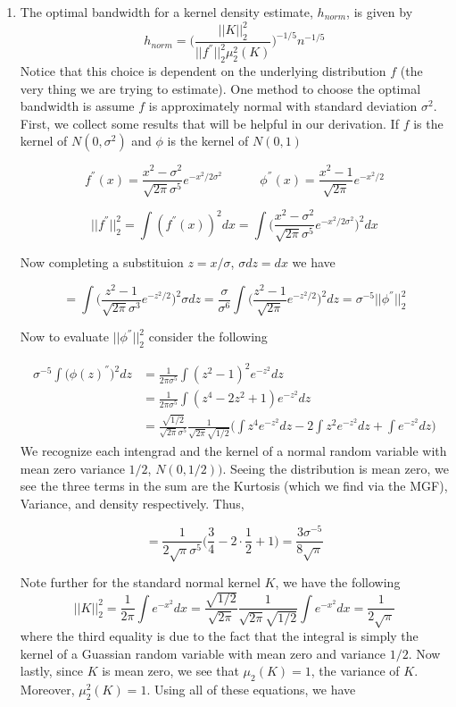 \documentclass[12pt]{article}  %
\begin{document}
\begin{enumerate}

\item The optimal bandwidth for a kernel density estimate, $h_{norm}$, is given by $$h_{norm} = \Big(\frac{||K||_{2}^2}{||f^{''}||_2^2\mu_{2}^{2}(K)}\Big)^{-1/5}n^{-1/5}$$ Notice that this choice is dependent on the underlying distribution $f$ (the very thing we are trying to estimate). One method to choose the optimal bandwidth is assume $f$ is approximately normal with standard deviation $\sigma^2$. First, we collect some results that will be helpful in our derivation. If $f$ is the kernel of $N(0,\sigma^2)$ and $\phi$ is the kernel of $N(0,1)$

$$f^{''}(x) = \frac{x^2-\sigma^2}{\sqrt{2\pi}\sigma^5}e^{-x^2/2\sigma^2}\hspace{3em}\phi^{''}(x) =\frac{x^2 -1}{\sqrt{2\pi}}e^{-x^2/2} $$

$$||f^{''}||_2^2 = \int (f^{''}(x))^2dx = \int \bigg(\frac{x^2-\sigma^2}{\sqrt{2\pi}\sigma^5}e^{-x^2/2\sigma^2}\bigg)^2dx$$

Now completing a substituion $z = x/\sigma$, $\sigma dz = dx$ we have 

$$ = \int \bigg(\frac{z^2-1}{\sqrt{2\pi}\sigma^3}e^{-z^2/2}\bigg)^2\sigma dz = \frac{\sigma}{\sigma^6}\int \bigg(\frac{z^2-1}{\sqrt{2\pi}}e^{-z^2/2}\bigg)^2dz = \sigma^{-5}||\phi^{''}||_2^2$$

Now to evaluate $||\phi^{''}||_2^2$ consider the following 

\begin{align*}
\sigma^{-5}\int\big(\phi(z)^{''}\big)^2dz &= \frac{1}{2\pi\sigma^5}\int (z^2-1)^2e^{-z^2}dz\\
&=  \frac{1}{2\pi\sigma^5}\int(z^4 -2z^2 + 1)e^{-z^2}dz\\
&= \frac{\sqrt{1/2}}{\sqrt{2\pi}\sigma^5}\frac{1}{\sqrt{2\pi}\sqrt{1/2}}\bigg(\int z^4e^{-z^2}dz -2 \int z^2e^{-z^2}dz + \int e^{-z^2}dz\bigg)
\end{align*}
We recognize each intengrad and the kernel of a normal random variable with mean zero variance $1/2$, $N(0,1/2))$. Seeing the distribution is mean zero, we see the three terms in the sum are the Kurtosis (which we find via the MGF), Variance, and density respectively. Thus, 

$$ = \frac{1}{2\sqrt{\pi}\sigma^5}\Big(\frac{3}{4} - 2\cdot\frac{1}{2} + 1\Big) = \frac{3\sigma^{-5}}{8\sqrt{\pi}}$$

Note further for the standard normal kernel $K$, we have the following 
$$||K||_2^2 = \frac{1}{2\pi}\int e^{-x^2}dx = \frac{\sqrt{1/2}}{\sqrt{2\pi}}\frac{1}{\sqrt{2\pi}\sqrt{1/2}}\int e^{-x^2}dx = \frac{1}{2\sqrt{\pi}}$$
where the third equality is due to the fact that the integral is simply the kernel of a Guassian random variable with mean zero and variance $1/2$. Now lastly, since $K$ is mean zero, we see that $\mu_2(K) = 1$, the variance of $K$. Moreover, $\mu_{2}^2(K) = 1$. Using all of these equations, we have 


\end{enumerate}
\end{document}
